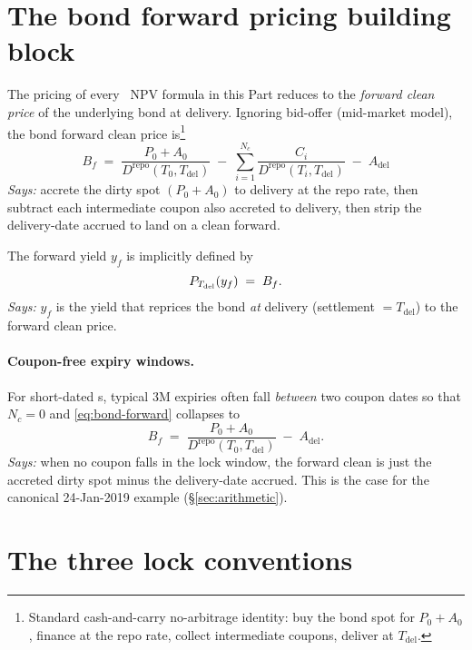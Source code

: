 \documentclass[11pt,a4paper]{article}
\newcommand{\Tlock}{\text{T-Lock}}
\newcommand{\Drepo}{D^{\mathrm{repo}}}
\newcommand{\Tdel}{T_{\mathrm{del}}}
\newcommand{\Adel}{A_{\mathrm{del}}}
\newcommand{\Bf}{B_f}
\newcommand{\Ncp}{N_{c}}        %
\begin{document}
\section{The bond forward pricing building block}\label{sec:bondfwd}

The pricing of every \Tlock\ NPV formula in this Part reduces to the
\emph{forward clean price} of the underlying bond at delivery.
Ignoring bid-offer (mid-market model), the bond forward clean price
is\footnote{Standard cash-and-carry no-arbitrage identity: buy the
bond spot for $P_0+A_0$, finance at the repo rate, collect
intermediate coupons, deliver at $\Tdel$.}
\begin{equation}\label{eq:bond-forward}
\boxed{\;
\Bf \;=\;
\frac{P_0 + A_0}{\Drepo(T_0,\Tdel)}
\;-\;
\sum_{i=1}^{\Ncp}\frac{C_i}{\Drepo(T_i,\Tdel)}
\;-\;\Adel\;
}
\end{equation}
\textit{Says:} accrete the dirty spot $(P_0 + A_0)$ to delivery at the
repo rate, then subtract each intermediate coupon also accreted to
delivery, then strip the delivery-date accrued to land on a clean
forward.

The forward yield $y_f$ is implicitly defined by
\begin{equation}\label{eq:forward-yield}
  \Bond{\Tdel}{y_f} \;=\; \Bf.
\end{equation}
\textit{Says:} $y_f$ is the yield that reprices the bond \emph{at}
delivery (settlement $=\Tdel$) to the forward clean price.

\paragraph{Coupon-free expiry windows.} For short-dated \Tlock s,
typical 3M expiries often fall \emph{between} two coupon dates so that
$\Ncp = 0$ and \eqref{eq:bond-forward} collapses to
\begin{equation}\label{eq:bond-forward-no-coupon}
  \Bf \;=\; \frac{P_0 + A_0}{\Drepo(T_0, \Tdel)} \;-\; \Adel.
\end{equation}
\textit{Says:} when no coupon falls in the lock window, the forward
clean is just the accreted dirty spot minus the delivery-date accrued.
This is the case for the canonical 24-Jan-2019 example
(\S\ref{sec:arithmetic}).

\section{The three lock conventions}\label{sec:three-conv}
\end{document}
